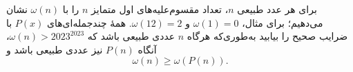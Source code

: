 برای هر عدد طبیعی $n$، تعداد مقسوم‌علیه‌های اول متمایز $n$ را با $\omega(n)$ نشان می‌دهیم؛ برای مثال، $\omega(1)=0$ و $\omega(12)=2$. همهٔ چندجمله‌ای‌های $P(x)$ با ضرایب صحیح را بیابید به‌طوری‌که هرگاه $n$ عددی طبیعی باشد که
$
\omega(n)>2023^{2023}
$،
آنگاه $P(n)$ نیز عددی طبیعی باشد و
$$
\omega(n)\geq\omega(P(n)).
$$
